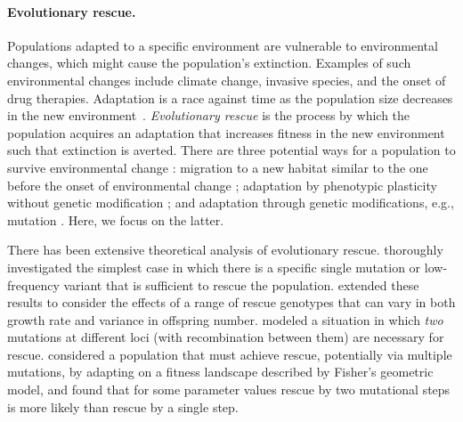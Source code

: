 \documentclass[12pt]{extarticle}
\begin{document}
\paragraph{Evolutionary rescue.} Populations adapted to a specific environment are vulnerable to environmental changes, which might cause the population's extinction. Examples of such environmental changes include climate change, invasive species, and the onset of drug therapies. Adaptation is a race against time as the population size decreases in the new environment~\citep{tanaka2022surviving}. 
\emph{Evolutionary rescue} is the process by which the population acquires an adaptation that increases fitness in the new environment such that extinction is averted.
There are three potential ways for a population to survive environmental change \citep{alexander2014evolutionary,bell2017evolutionary}: %
migration to a new habitat similar to the one before the onset of environmental change \citep{harsch2014keeping,cobbold2020should,zhou2022range}; 
adaptation by phenotypic plasticity without genetic modification \citep{carja2019evolutionary,carja2017evolutionary,levien2021non,gunnarsson2020understanding}; 
and adaptation through genetic modifications, e.g., mutation \citep{gomulkiewicz1995does,uecker2014evolutionary,uecker2016role,uecker2011fixation,orr2014population}. 
Here, we focus on the latter. 

There has been extensive theoretical analysis of evolutionary rescue.
\citet{orr2008population,orr2014population} thoroughly investigated the simplest case in which there is a specific single mutation or low-frequency variant that is sufficient to rescue the population. 
\citet{martin2013probability} extended these results to consider the effects of a range of rescue genotypes that can vary in both growth rate and variance in offspring number.
\citet{uecker2016role} modeled a situation in which \textit{two} mutations at different loci (with recombination between them) are necessary for rescue. 
\citet{osmond_genetic_2020} considered a population that must achieve rescue, potentially via multiple mutations, by adapting on a fitness landscape described by Fisher's geometric model,
and found that for some parameter values rescue by two mutational steps is more likely than rescue by a single step.
\end{document}
